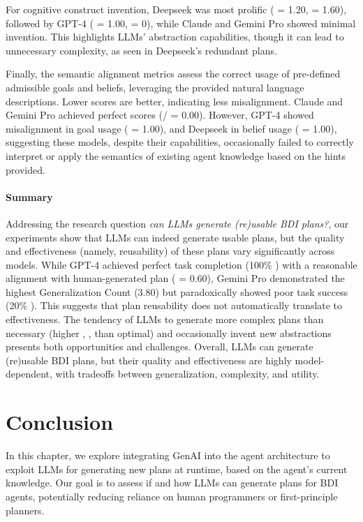 For cognitive construct invention,
 Deepseek was most prolific (\NGC{} = 1.20, \NBC{} = 1.60),
 followed by GPT-4 (\NGC{} = 1.00, \NBC{} = 0),
 while Claude and Gemini Pro showed minimal invention.
%
This highlights LLMs' abstraction capabilities, though it can lead to unnecessary complexity, as seen in Deepseek's redundant plans.

Finally, the semantic alignment metrics assess
 the correct usage of pre-defined admissible goals and beliefs,
 leveraging the provided natural language descriptions.
%
Lower scores are better,
 indicating less misalignment.
%
Claude and Gemini Pro achieved perfect scores (\GSM{}/\BSM{} = 0.00).
 However, GPT-4 showed misalignment in goal usage (\GSM{} = 1.00),
 and Deepseek in belief usage (\BSM{} = 1.00),
 suggesting these models,
 despite their capabilities,
 occasionally failed to correctly interpret or apply the semantics of existing agent knowledge based on the hints provided.
\paragraph{Summary}
Addressing the research question \emph{can LLMs generate (re)usable BDI plans?},
 our experiments show that LLMs can indeed generate usable plans,
 but the quality and effectiveness (namely, reusability) of these plans vary significantly across models.
%
While GPT-4 achieved perfect task completion (100\% \TSR{})
 with a reasonable alignment with human-generated plan (\PRAS{} = 0.60),
 Gemini Pro demonstrated the highest Generalization Count (3.80)
 but paradoxically showed poor task success (20\% \TSR{}).
%
This suggests that plan reusability does not automatically translate to effectiveness.
%
The tendency of LLMs to generate more complex plans than necessary (higher \PC{}, \CC{}, \PBC{} than optimal)
%
and occasionally invent new abstractions presents both opportunities and challenges.
%
Overall, LLMs can generate (re)usable BDI plans, but their quality and effectiveness are highly model-dependent, with tradeoffs between generalization, complexity, and utility.

\section{Conclusion}\label{sec:genai:conclusion}

In this chapter,
we explore integrating \ac{GenAI} into the \agentspeak{} agent architecture
to exploit \acp{LLM} for generating new plans at runtime, 
based on the agent's current knowledge.
%
Our goal is to assess if and how \acp{LLM} can generate plans for \ac{BDI} agents,
potentially reducing reliance on human programmers or first-principle planners.


